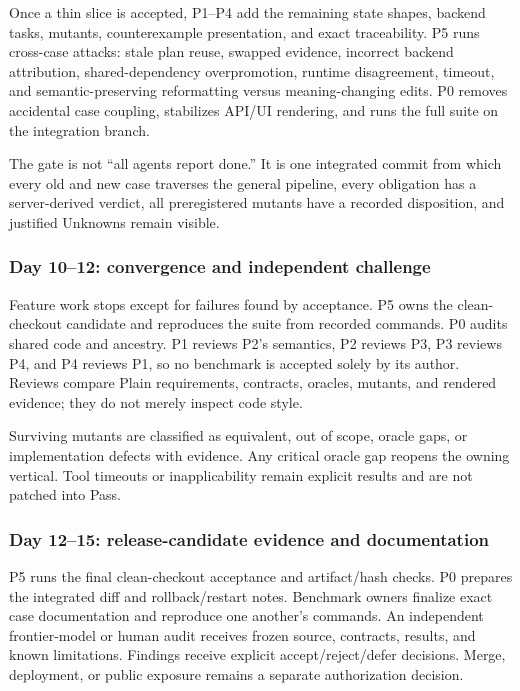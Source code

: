 \documentclass[11pt]{article}
\begin{document}
Once a thin slice is accepted, P1--P4 add the remaining state shapes, backend
tasks, mutants, counterexample presentation, and exact traceability.  P5 runs
cross-case attacks: stale plan reuse, swapped evidence, incorrect backend
attribution, shared-dependency overpromotion, runtime disagreement, timeout,
and semantic-preserving reformatting versus meaning-changing edits.  P0 removes
accidental case coupling, stabilizes API/UI rendering, and runs the full suite
on the integration branch.

The gate is not ``all agents report done.''  It is one integrated commit from
which every old and new case traverses the general pipeline, every obligation
has a server-derived verdict, all preregistered mutants have a recorded
disposition, and justified Unknowns remain visible.

\subsubsection*{Day 10--12: convergence and independent challenge}

Feature work stops except for failures found by acceptance.  P5 owns the
clean-checkout candidate and reproduces the suite from recorded commands.  P0
audits shared code and ancestry.  P1 reviews P2's semantics, P2 reviews P3,
P3 reviews P4, and P4 reviews P1, so no benchmark is accepted solely by its
author.  Reviews compare Plain requirements, contracts, oracles, mutants, and
rendered evidence; they do not merely inspect code style.

Surviving mutants are classified as equivalent, out of scope, oracle gaps, or
implementation defects with evidence.  Any critical oracle gap reopens the
owning vertical.  Tool timeouts or inapplicability remain explicit results and
are not patched into Pass.

\subsubsection*{Day 12--15: release-candidate evidence and documentation}

P5 runs the final clean-checkout acceptance and artifact/hash checks.  P0
prepares the integrated diff and rollback/restart notes.  Benchmark owners
finalize exact case documentation and reproduce one another's commands.
An independent frontier-model or human audit receives frozen source,
contracts, results, and known limitations.  Findings receive explicit
accept/reject/defer decisions.  Merge, deployment, or public exposure remains
a separate authorization decision.
\end{document}
